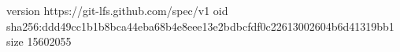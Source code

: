 version https://git-lfs.github.com/spec/v1
oid sha256:ddd49cc1b1b8bca44eba68b4e8eee13e2bdbcfdf0c22613002604b6d41319bb1
size 15602055
